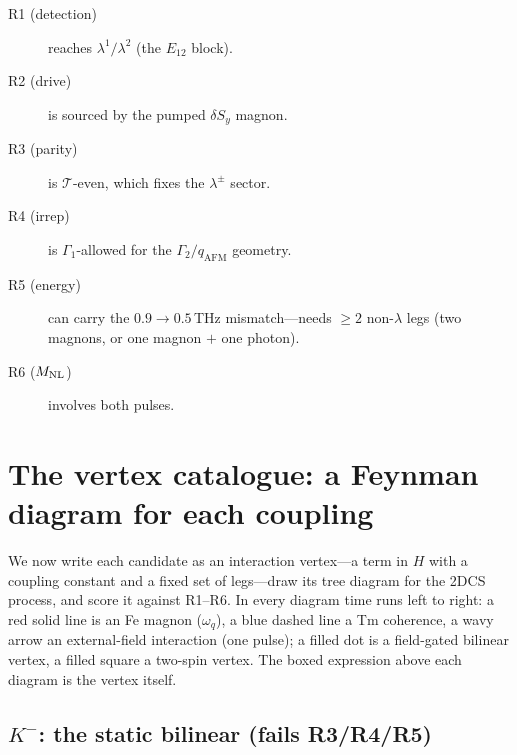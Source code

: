 \documentclass[11pt,a4paper]{article}
\begin{document}
\begin{keybox}[title={Scorecard R1--R6}]
\begin{description}
\item[R1 (detection)] reaches $\lambda^1/\lambda^2$ (the $E_{12}$ block).
\item[R2 (drive)] is sourced by the pumped $\delta S_y$ magnon.
\item[R3 (parity)] is $\mathcal T$-even, which fixes the $\lambda^\pm$ sector.
\item[R4 (irrep)] is $\Gamma_1$-allowed for the $\Gamma_2/q_{\mathrm{AFM}}$ geometry.
\item[R5 (energy)] can carry the $0.9\!\to\!0.5\,$THz mismatch---needs $\ge2$ non-$\lambda$ legs (two magnons, or one magnon $+$ one photon).
\item[R6 ($M_{\rm NL}$)] involves both pulses.
\end{description}
\end{keybox}

\section{The vertex catalogue: a Feynman diagram for each coupling}
\label{sec:catalog}

We now write each candidate as an interaction vertex---a term in $H$ with a
coupling constant and a fixed set of legs---draw its tree diagram for the 2DCS
process, and score it against R1--R6.  In every diagram time runs left to
right: a red solid line is an Fe magnon ($\omega_q$), a blue dashed line a Tm
coherence, a wavy arrow an external-field interaction (one pulse); a filled dot
is a field-gated bilinear vertex, a filled square a two-spin vertex.  The boxed
expression above each diagram is the vertex itself.

\subsection{$K^-$: the static bilinear (fails R3/R4/R5)}
\end{document}
